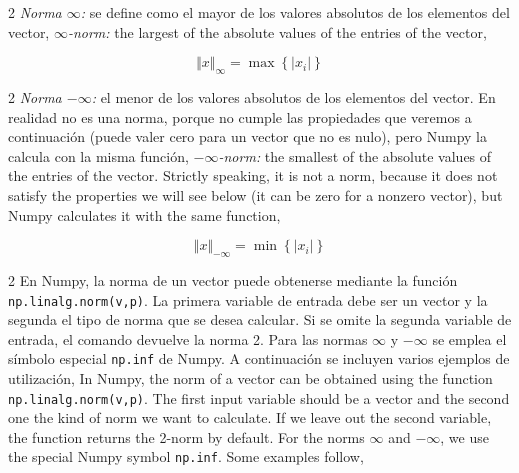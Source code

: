\begin{paracol}{2}
\emph{Norma $\infty$:} se define como el mayor de los valores absolutos de los elementos del vector,
\switchcolumn
\emph{$\infty$-norm:} the largest of the absolute values of the entries of the vector,
\end{paracol}

\begin{equation*}
\Vert x \Vert_\infty =\max \left\lbrace \vert x_i\vert\right \rbrace 
\end{equation*}

\begin{paracol}{2}
\emph{Norma $-\infty$:} el menor de los valores absolutos de los elementos del vector. En realidad no es una norma, porque no cumple las propiedades que veremos a continuación (puede valer cero para un vector que no es nulo), pero Numpy la calcula con la misma función,
\switchcolumn
\emph{$-\infty$-norm:} the smallest of the absolute values of the entries of the vector. Strictly speaking, it is not a norm, because it does not satisfy the properties we will see below (it can be zero for a nonzero vector), but Numpy calculates it with the same function, 
\end{paracol}
\begin{equation*}
\Vert x \Vert_{-\infty} =\min \left\lbrace \vert x_i\vert\right \rbrace 
\end{equation*}
\begin{paracol}{2}
En Numpy, la norma de un vector puede obtenerse mediante la función \texttt{np.linalg.norm(v,p)}. La primera variable de entrada debe ser un vector y la segunda el tipo de norma que se desea calcular. Si se omite la segunda variable de entrada, el comando devuelve la norma 2. Para las normas $\infty$ y $-\infty$ se emplea el símbolo especial \texttt{np.inf} de Numpy. A continuación se incluyen varios ejemplos de utilización,
\switchcolumn
In Numpy, the norm of a vector can be obtained using the function \texttt{np.linalg.norm(v,p)}. The first input variable should be a vector and the second one the kind of norm we want to calculate. If we leave out the second variable, the function returns the 2-norm by default. For the norms $\infty$ and $-\infty$, we use the special Numpy symbol \texttt{np.inf}. Some examples follow,
\end{paracol}

